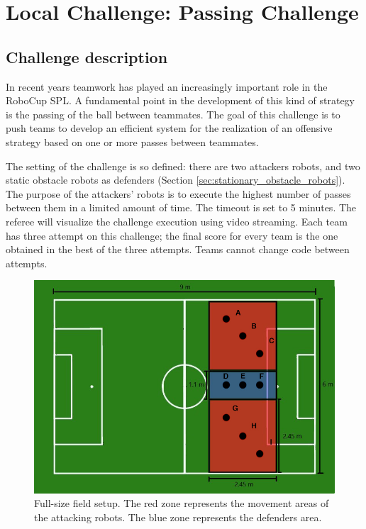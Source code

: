 \section{Local Challenge: Passing Challenge}
\label{sec:PassingChallenge}

\subsection{Challenge description}
In recent years teamwork has played an increasingly important role in the RoboCup SPL. A fundamental point in the development of this kind of strategy is the passing of the ball between teammates. The goal of this challenge is to push teams to develop an efficient system for the realization of an offensive strategy based on one or more passes between teammates. 

The setting of the challenge is so defined: there are two attackers robots, and two static obstacle robots as defenders (\cf Section \ref{sec:stationary_obstacle_robots}). The purpose of the attackers' robots is to execute the highest number of passes between them in a limited amount of time. The timeout is set to 5 minutes.
The referee will visualize the challenge execution using video streaming. 
Each team has three attempt on this challenge; the final score for every team is the one obtained in the best of the three attempts. Teams cannot change code between attempts.
\begin{figure}[ht]
\includegraphics[width=0.95\linewidth]{figs/ch_2_full.jpg}
\caption{Full-size field setup. The red zone represents the movement areas of the attacking robots. The blue zone represents the defenders area. }
\label{ch2:zone96}
\centering
\end{figure}


